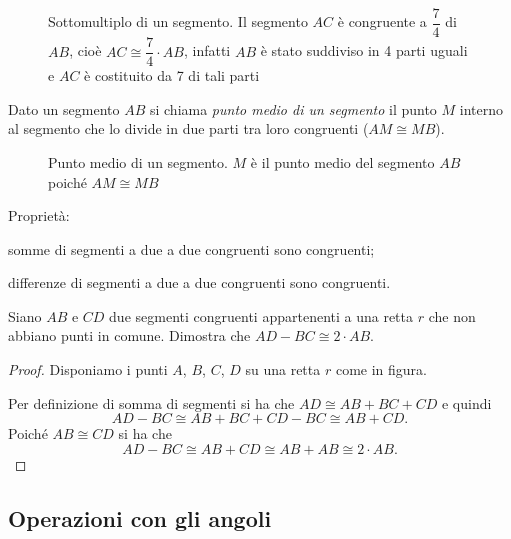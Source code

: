 \begin{figure}[htb]
\centering
\caption{Sottomultiplo di un segmento. Il segmento $AC$ è congruente a $\dfrac{7}{4}$ di $AB$, cioè $AC\cong\dfrac{7}{4}\cdot AB$, infatti $AB$ è stato suddiviso in 4 parti uguali e $AC$ è costituito da 7 di tali parti}
\end{figure}

\begin{definizione}
Dato un segmento $AB$ si chiama \emph{punto medio di un segmento} il punto $M$ interno al segmento che lo divide in due parti tra loro congruenti ($AM\cong MB$).
\end{definizione}

\begin{figure}[htb]
\centering
\caption{Punto medio di un segmento. $M$ è il punto medio del segmento $AB$ poiché $AM\cong MB$}
\end{figure}

Proprietà:
\begin{itemize*}
\item somme di segmenti a due a due congruenti sono congruenti; 
\item differenze di segmenti a due a due congruenti sono congruenti.
\end{itemize*}

\begin{exrig}
\begin{esempio}
Siano $AB$ e $CD$ due segmenti congruenti appartenenti a una retta $r$ che non abbiano punti in comune. Dimostra che $AD-BC\cong 2\cdot AB$.
\begin{proof}
Disponiamo i punti $A$, $B$, $C$, $D$ su una retta $r$ come in figura.
\begin{figure}[htb]
\centering
\end{figure}

Per definizione di somma di segmenti si ha che $AD\cong AB+BC+CD$ e quindi
\[AD-BC\cong AB+BC+CD-BC\cong AB+CD.\]
Poiché $AB\cong CD$ si ha che
\[AD-BC\cong AB+CD\cong AB+AB\cong 2\cdot AB.\]
\end{proof}
\end{esempio}
\end{exrig}

\subsection{Operazioni con gli angoli}

